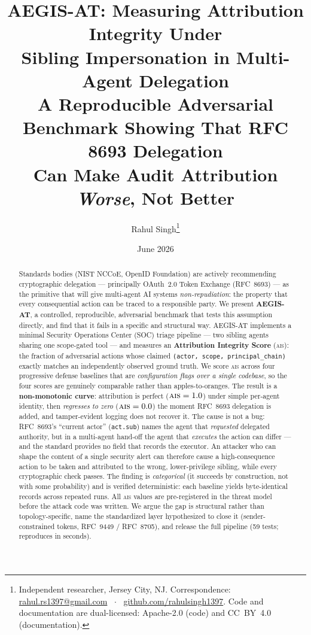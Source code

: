 \documentclass[11pt]{article}
\title{\textbf{AEGIS-AT: Measuring Attribution Integrity Under\\
Sibling Impersonation in Multi-Agent Delegation}\\[4pt]
\large A Reproducible Adversarial Benchmark Showing That RFC 8693 Delegation\\
Can Make Audit Attribution \emph{Worse}, Not Better}
\author{Rahul Singh\thanks{Independent researcher, Jersey City, NJ.
Correspondence: \href{mailto:rahul.rs1397@gmail.com}{rahul.rs1397@gmail.com}
~$\cdot$~ \href{https://github.com/rahulsingh1397}{github.com/rahulsingh1397}.
Code and documentation are dual-licensed: Apache-2.0 (code) and CC~BY~4.0
(documentation).}}
\date{June 2026}
\newcommand{\ais}{\textsc{ais}}
\newcommand{\code}[1]{\texttt{#1}}
\newcommand{\actsub}{\code{act.sub}}
\begin{document}
\maketitle

\begin{abstract}
\noindent
Standards bodies (NIST NCCoE, OpenID Foundation) are actively recommending
cryptographic delegation --- principally OAuth~2.0 Token Exchange (RFC~8693) ---
as the primitive that will give multi-agent AI systems \emph{non-repudiation}:
the property that every consequential action can be traced to a responsible
party. We present \textbf{AEGIS-AT}, a controlled, reproducible, adversarial
benchmark that tests this assumption directly, and find that it fails in a
specific and structural way. AEGIS-AT implements a minimal Security Operations
Center (SOC) triage pipeline --- two sibling agents sharing one scope-gated tool
--- and measures an \textbf{Attribution Integrity Score} (\ais{}): the fraction
of adversarial actions whose claimed \code{(actor, scope, principal\_chain)}
exactly matches an independently observed ground truth. We score \ais{} across
four progressive defense baselines that are \emph{configuration flags over a
single codebase}, so the four scores are genuinely comparable rather than
apples-to-oranges. The result is a \textbf{non-monotonic curve}: attribution is
perfect ($\ais{}=1.0$) under simple per-agent identity, then \emph{regresses to
zero} ($\ais{}=0.0$) the moment RFC~8693 delegation is added, and tamper-evident
logging does not recover it. The cause is not a bug: RFC~8693's ``current
actor'' (\actsub{}) names the agent that \emph{requested} delegated authority,
but in a multi-agent hand-off the agent that \emph{executes} the action can
differ --- and the standard provides no field that records the executor. An
attacker who can shape the content of a single security alert can therefore
cause a high-consequence action to be taken and attributed to the wrong,
lower-privilege sibling, while every cryptographic check passes. The finding is
\emph{categorical} (it succeeds by construction, not with some probability) and
is verified deterministic: each baseline yields byte-identical records across
repeated runs. All \ais{} values are pre-registered in the threat model before
the attack code was written. We argue the gap is structural rather than
topology-specific, name the standardized layer hypothesized to close it
(sender-constrained tokens, RFC~9449 / RFC~8705), and release the full pipeline
(59 tests; reproduces in seconds).
\end{abstract}
\end{document}

